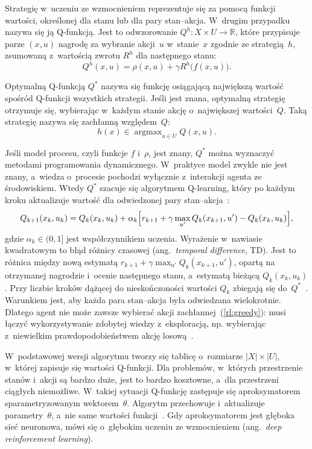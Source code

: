 Strategię w~uczeniu ze wzmocnieniem reprezentuje się za pomocą funkcji
wartości, określonej dla stanu lub dla pary stan--akcja. W~drugim przypadku
nazywa się ją Q-funkcją. Jest to odwzorowanie $Q^h \colon X \times U \to \mathbb{R}$, które
przypisuje parze $(x, u)$ nagrodę za wybranie akcji~$u$ w~stanie~$x$ zgodnie
ze strategią~$h$, zsumowaną z~wartością zwrotu $R^h$ dla następnego stanu:
\begin{equation}
  Q^h(x, u) = \rho(x, u) + \gamma R^h\bigl(f(x, u)\bigr).
  \label{rl:qfunc}
\end{equation}

Optymalną Q-funkcją $Q^*$ nazywa się funkcję osiągającą największą wartość
spośród Q-funkcji wszystkich strategii. Jeśli jest znana, optymalną strategię
otrzymuje się, wybierając w~każdym stanie akcję o~największej wartości~$Q$.
Taką strategię nazywa się zachłanną względem~$Q$:
\begin{equation}
  h(x) \in \mathop{\arg\max}_{u \in U} Q(x, u).
  \label{rl:greedy}
\end{equation}

Jeśli model procesu, czyli funkcje $f$ i~$\rho$, jest znany, $Q^*$ można
wyznaczyć metodami programowania dynamicznego. W~praktyce model zwykle
nie jest znany, a~wiedza o~procesie pochodzi wyłącznie z~interakcji agenta
ze środowiskiem. Wtedy $Q^*$ szacuje się algorytmem Q-learning, który po
każdym kroku aktualizuje wartość dla odwiedzonej pary stan--akcja~\cite{Rak2013RL}:
\begin{equation}
  Q_{k+1}(x_k, u_k) = Q_k(x_k, u_k) + \alpha_k \Bigl[ r_{k+1}
  + \gamma \max_{u'} Q_k(x_{k+1}, u') - Q_k(x_k, u_k) \Bigr],
  \label{rl:q-learning}
\end{equation}
gdzie $\alpha_k \in (0, 1]$ jest współczynnikiem uczenia. Wyrażenie w~nawiasie
kwadratowym to błąd różnicy czasowej (ang.~\emph{temporal difference}, TD).
Jest to różnica między nową estymatą $r_{k+1} + \gamma \max_{u'} Q_k(x_{k+1}, u')$,
opartą na otrzymanej nagrodzie i~ocenie następnego stanu, a~estymatą bieżącą
$Q_k(x_k, u_k)$. Przy liczbie kroków dążącej do nieskończoności wartości
$Q_k$ zbiegają się do~$Q^*$~\cite{Rak2013RL}. Warunkiem jest, aby każda para
stan--akcja była odwiedzana wielokrotnie. Dlatego agent nie może zawsze wybierać
akcji zachłannej~(\ref{rl:greedy}): musi łączyć wykorzystywanie zdobytej wiedzy
z~eksploracją, np. wybierając z~niewielkim prawdopodobieństwem akcję losową~\cite{Sutton2018RL}.

W~podstawowej wersji algorytmu tworzy się tablicę o~rozmiarze $|X| \times |U|$,
w~której zapisuje się wartości Q-funkcji. Dla problemów, w~których przestrzenie
stanów i~akcji są bardzo duże, jest to bardzo kosztowne, a~dla przestrzeni ciągłych
niemożliwe. W~takiej sytuacji Q-funkcję zastępuje się aproksymatorem sparametryzowanym
wektorem~$\theta$. Algorytm przechowuje i~aktualizuje parametry~$\theta$, a~nie
same wartości funkcji~\cite{Rak2013RL}. Gdy aproksymatorem jest głęboka sieć neuronowa,
mówi się o~głębokim uczeniu ze wzmocnieniem (ang.~\emph{deep reinforcement learning}).

